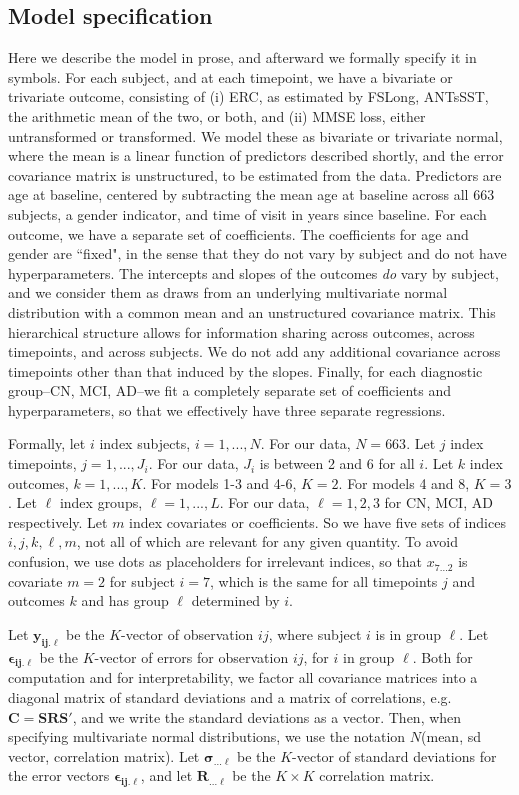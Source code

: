 \documentclass[12pt]{article}
\begin{document}
\pagebreak
\subsection{Model specification}

Here we describe the model in prose, and afterward we formally specify it in symbols. For each subject, and at each timepoint, we have a bivariate or trivariate outcome, consisting of (i) ERC, as estimated by FSLong, ANTsSST, the arithmetic mean of the two, or both, and (ii) MMSE loss, either untransformed or transformed. We model these as bivariate or trivariate normal, where the mean is a linear function of predictors described shortly, and the error covariance matrix is unstructured, to be estimated from the data. Predictors are age at baseline, centered by subtracting the mean age at baseline across all 663 subjects, a gender indicator, and time of visit in years since baseline. For each outcome, we have a separate set of coefficients. The coefficients for age and gender are ``fixed", in the sense that they do not vary by subject and do not have hyperparameters. The intercepts and slopes of the outcomes \textit{do} vary by subject, and we consider them as draws from an underlying multivariate normal distribution with a common mean and an unstructured covariance matrix. This hierarchical structure allows for information sharing across outcomes, across timepoints, and across subjects. We do not add any additional covariance across timepoints other than that induced by the slopes. Finally, for each diagnostic group--CN, MCI, AD--we fit a completely separate set of coefficients and hyperparameters, so that we effectively have three separate regressions. 

Formally, let $i$ index subjects, $i=1,...,N$. For our data, $N=663$. Let $j$ index timepoints, $j=1,...,J_i$. For our data, $J_i$ is between 2 and 6 for all $i$. Let $k$ index outcomes, $k=1,...,K$. For models 1-3 and 4-6, $K=2.$ For models 4 and 8, $K=3$. Let $\ell$ index groups, $\ell=1,...,L$. For our data, $\ell=1,2,3$ for CN, MCI, AD respectively. Let $m$ index covariates or coefficients. So we have five sets of indices $i,j,k,\ell,m$, not all of which are relevant for any given quantity. To avoid confusion, we use dots as placeholders for irrelevant indices, so that $x_{7...2}$ is covariate $m=2$ for subject $i=7$, which is the same for all timepoints $j$ and outcomes $k$ and has group $\ell$ determined by $i$. 

Let $\boldsymbol{y_{ij.\ell}}$ be the $K$-vector of observation $ij$, where subject $i$ is in group $\ell$. Let $\boldsymbol{\epsilon_{ij.\ell}}$ be the $K$-vector of errors for observation $ij$, for $i$ in group $\ell$. Both for computation and for interpretability, we factor all covariance matrices into a diagonal matrix of standard deviations and a matrix of correlations, e.g. $\boldsymbol{C=SRS'}$, and we write the standard deviations as a vector. Then, when specifying multivariate normal distributions, we use the notation $N$(mean, sd vector, correlation matrix). Let $\boldsymbol{\sigma_{...\ell}}$ be the $K$-vector of standard deviations for the error vectors $\boldsymbol{\epsilon_{ij.\ell}}$, and let $\boldsymbol{R_{...\ell}}$ be the $K \times K$ correlation matrix.
\end{document}
